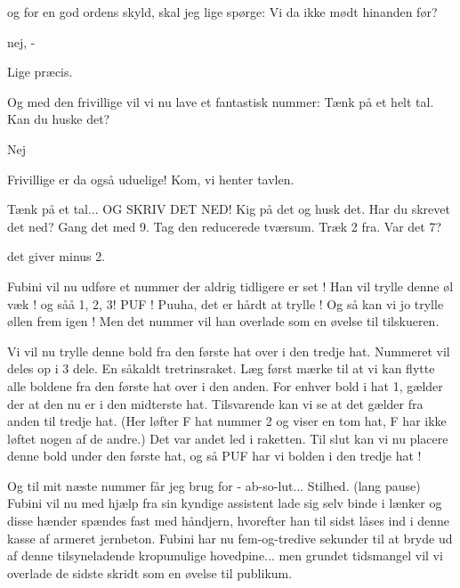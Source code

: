 \documentclass[a4paper,11pt]{article}
\begin{document}
\begin{sketch}

og for en god ordens skyld, skal jeg lige spørge: Vi da ikke mødt hinanden før?

nej, -

Lige præcis.

Og med den frivillige vil vi nu lave et fantastisk nummer:
Tænk på et helt tal. Kan du huske det?  

 Nej

Frivillige er da også uduelige! Kom, vi henter tavlen.


Tænk på et tal... OG SKRIV DET NED! Kig på det og husk det. Har du skrevet det ned? Gang det med 9. Tag den reducerede tværsum. Træk 2 fra. Var det 7?

det giver minus 2. 

 Fubini vil nu udføre et nummer der aldrig tidligere er set ! Han vil trylle denne øl væk ! og såå 1, 2, 3! PUF !  
Puuha, det er hårdt at trylle !
Og så kan vi jo trylle øllen frem igen ! Men det nummer vil han overlade som en øvelse til tilskueren.

Vi vil nu trylle denne bold fra den første hat over i den tredje hat. Nummeret vil deles op i 3 dele. En såkaldt tretrinsraket. Læg først mærke til at vi kan flytte alle boldene fra den første hat over i den anden. For enhver bold i hat 1, gælder der at den nu er i den midterste hat. Tilsvarende kan vi se at det gælder fra anden til tredje hat. (Her løfter F hat nummer 2 og viser en tom hat, F har ikke løftet nogen af de andre.) Det var andet led i raketten. Til slut kan vi nu placere denne bold under den første hat, og så PUF har vi bolden i den tredje hat !


Og til mit næste nummer får jeg brug for - ab-so-lut... Stilhed. (lang pause)
Fubini vil nu med hjælp fra sin kyndige assistent lade sig selv binde i lænker og disse hænder spændes fast med håndjern, hvorefter han til sidst låses ind i denne kasse af armeret jernbeton. Fubini har nu fem-og-tredive sekunder til at bryde ud af denne tilsyneladende kropumulige hovedpine... men grundet tidsmangel vil vi overlade de sidste skridt som en øvelse til publikum.


\end{sketch}
\end{document}
